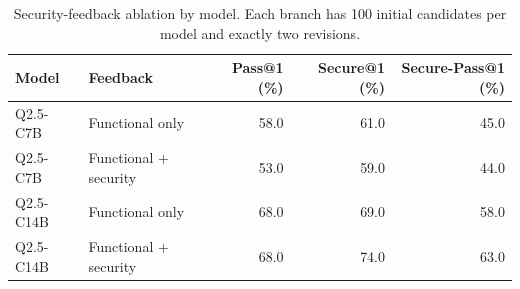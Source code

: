 \begin{table}[pos=htbp]
\caption{Security-feedback ablation by model. Each branch has 100 initial candidates per model and exactly two revisions.}
\centering\small
\begin{tabular}{llrrr}
\toprule
Model & Feedback & Pass@1 (\%) & Secure@1 (\%) & \textbf{Secure-Pass@1} (\%) \\
\midrule
Q2.5-C7B & Functional only & 58.0 & 61.0 & 45.0 \\
Q2.5-C7B & Functional + security & 53.0 & 59.0 & 44.0 \\
Q2.5-C14B & Functional only & 68.0 & 69.0 & 58.0 \\
Q2.5-C14B & Functional + security & 68.0 & 74.0 & 63.0 \\
\bottomrule
\end{tabular}
\end{table}

